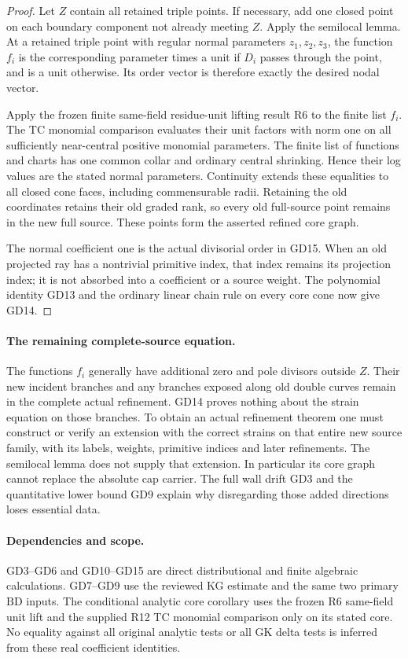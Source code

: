 \begin{proof}
Let \(Z\) contain all retained triple points.  If necessary,
add one closed point on each boundary component not
already meeting \(Z\).  Apply the semilocal lemma.
At a retained triple point with regular normal parameters
\(z_1,z_2,z_3\), the function \(f_i\) is the corresponding
parameter times a unit if \(D_i\) passes through the
point, and is a unit otherwise.  Its order vector is
therefore exactly the desired nodal vector.

Apply the frozen finite same-field residue-unit lifting
result R6 to the finite list \(f_i\).  The TC monomial
comparison evaluates their unit factors with norm one
on all sufficiently near-central positive monomial
parameters.  The finite list of functions and charts
has one common collar and ordinary central shrinking.
Hence their log values are the stated normal parameters.
Continuity extends these equalities to all closed cone
faces, including commensurable radii.  Retaining the old
coordinates retains their old graded rank, so every
old full-source point remains in the new full source.
These points form the asserted refined core graph.

The normal coefficient one is the actual divisorial
order in GD15.  When an old projected ray has a
nontrivial primitive index, that index remains its
projection index; it is not absorbed into a coefficient
or a source weight.  The polynomial identity GD13 and
the ordinary linear chain rule on every core cone now
give GD14.
\end{proof}

\paragraph{The remaining complete-source equation.}
The functions \(f_i\) generally have additional zero and
pole divisors outside \(Z\).  Their new incident branches
and any branches exposed along old double curves remain
in the complete actual refinement.  GD14 proves nothing
about the strain equation on those branches.  To obtain
an actual refinement theorem one must construct or verify
an extension with the correct strains on that entire
new source family, with its labels, weights, primitive
indices and later refinements.  The semilocal lemma does
not supply that extension.  In particular its core graph
cannot replace the absolute cap carrier.  The full
wall drift GD3 and the quantitative lower bound GD9
explain why disregarding those added directions loses
essential data.

\paragraph{Dependencies and scope.}
GD3--GD6 and GD10--GD15 are direct distributional and
finite algebraic calculations.  GD7--GD9 use the reviewed
KG estimate and the same two primary \(\mathrm{BD}\)
inputs.  The conditional analytic core corollary uses
the frozen R6 same-field unit lift and the supplied
R12 TC monomial comparison only on its stated core.
No equality against all original analytic tests or all
GK delta tests is inferred from these real coefficient
identities.
